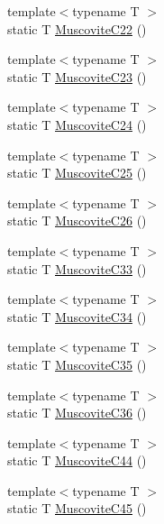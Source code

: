 \begin{DoxyCompactItemize}
\item 
{\footnotesize template$<$typename T $>$ }\\static T \mbox{\hyperlink{namespacempc_1_1data_a2963c13ae8e2e4ae7a99fc20b391e017}{Muscovite\+C22}} ()
\item 
{\footnotesize template$<$typename T $>$ }\\static T \mbox{\hyperlink{namespacempc_1_1data_a61cbb2e041d1f7e9b242883219055806}{Muscovite\+C23}} ()
\item 
{\footnotesize template$<$typename T $>$ }\\static T \mbox{\hyperlink{namespacempc_1_1data_ac5870f3f8c129765629b6fec66fa9c8d}{Muscovite\+C24}} ()
\item 
{\footnotesize template$<$typename T $>$ }\\static T \mbox{\hyperlink{namespacempc_1_1data_a09691a47da16c0fe7b3b292c0fc8394f}{Muscovite\+C25}} ()
\item 
{\footnotesize template$<$typename T $>$ }\\static T \mbox{\hyperlink{namespacempc_1_1data_a6b53137b363f4941d00380d4d9f6b68a}{Muscovite\+C26}} ()
\item 
{\footnotesize template$<$typename T $>$ }\\static T \mbox{\hyperlink{namespacempc_1_1data_a82396821c2b90ea12e05cb9815b84a4e}{Muscovite\+C33}} ()
\item 
{\footnotesize template$<$typename T $>$ }\\static T \mbox{\hyperlink{namespacempc_1_1data_a3be55c61f1d0329ce6e4d804ee8f16fa}{Muscovite\+C34}} ()
\item 
{\footnotesize template$<$typename T $>$ }\\static T \mbox{\hyperlink{namespacempc_1_1data_a92878bf4f517d28f3edf25a44b16abd2}{Muscovite\+C35}} ()
\item 
{\footnotesize template$<$typename T $>$ }\\static T \mbox{\hyperlink{namespacempc_1_1data_a551f2939c2653b76be2e1c26322307a3}{Muscovite\+C36}} ()
\item 
{\footnotesize template$<$typename T $>$ }\\static T \mbox{\hyperlink{namespacempc_1_1data_a772833cee56d18ef7c90f5cf8084d22b}{Muscovite\+C44}} ()
\item 
{\footnotesize template$<$typename T $>$ }\\static T \mbox{\hyperlink{namespacempc_1_1data_a7bee38c9d916f9c9743bf689bc17ecbb}{Muscovite\+C45}} ()
\item 

\end{DoxyCompactItemize}
